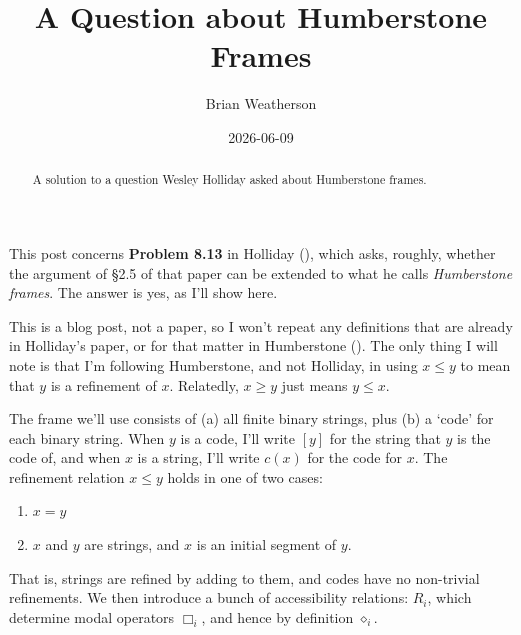 \documentclass[
  11pt,
  letterpaper,
  DIV=11,
  numbers=noendperiod,
  twoside]{scrartcl}
\title{A Question about Humberstone Frames}
\author{Brian Weatherson}
\date{2026-06-09}
\providecommand{\tightlist}{%
  \setlength{\itemsep}{0pt}\setlength{\parskip}{0pt}}
\begin{document}
\maketitle
\begin{abstract}
\noindent A solution to a question Wesley Holliday asked about
Humberstone frames.
\end{abstract}


This post concerns \textbf{Problem 8.13} in Holliday
(), which asks, roughly, whether the
argument of §2.5 of that paper can be extended to what he calls
\emph{Humberstone frames}. The answer is yes, as I'll show here.

This is a blog post, not a paper, so I won't repeat any definitions that
are already in Holliday's paper, or for that matter in Humberstone
(). The only thing I will note is
that I'm following Humberstone, and not Holliday, in using \(x \leq y\)
to mean that \(y\) is a refinement of \(x\). Relatedly, \(x \geq y\)
just means \(y \leq x\).

The frame we'll use consists of (a) all finite binary strings, plus (b)
a `code' for each binary string. When \(y\) is a code, I'll write
\([y]\) for the string that \(y\) is the code of, and when \(x\) is a
string, I'll write \(c(x)\) for the code for \(x\). The refinement
relation \(x \leq y\) holds in one of two cases:

\begin{enumerate}
\def\labelenumi{\arabic{enumi}.}
\tightlist
\item
  \(x=y\)
\item
  \(x\) and \(y\) are strings, and \(x\) is an initial segment of \(y\).
\end{enumerate}

That is, strings are refined by adding to them, and codes have no
non-trivial refinements. We then introduce a bunch of accessibility
relations: \(R_i\), which determine modal operators \(\Box_i\), and
hence by definition \(\diamond_i\).
\end{document}

